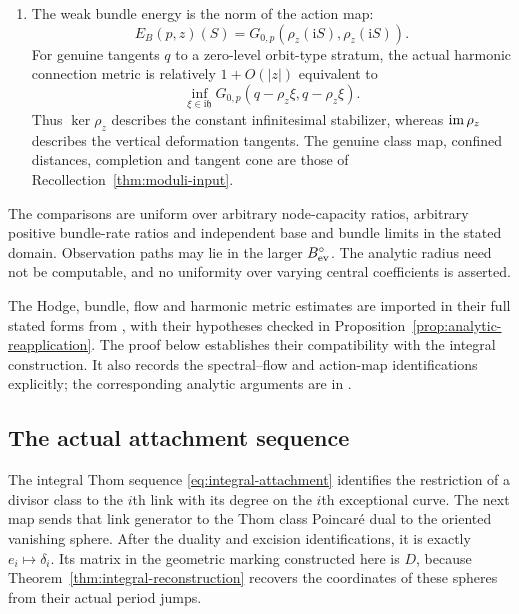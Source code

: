 \begin{theorem}
\begin{enumerate}
\item The weak bundle energy is the norm of the action map:
\begin{equation}\label{eq:action-energy-identity}
 E_B(p,z)(S)=G_{0,p}(\rho_z(\mathrm iS),\rho_z(\mathrm iS)).
\end{equation}
For genuine tangents $q$ to a zero-level orbit-type stratum,
the actual harmonic connection metric is relatively
$1+O(|z|)$ equivalent to
\begin{equation}\label{eq:integrated-quotient}
 \inf_{\xi\in\mathrm i\mathfrak h}
       G_{0,p}(q-\rho_z\xi,q-\rho_z\xi).
\end{equation}
Thus $\ker\rho_z$ describes the constant infinitesimal
stabilizer, whereas $\operatorname{im}\rho_z$ describes the vertical
deformation tangents. The genuine class map, confined
distances, completion and tangent cone are those of
Recollection~\ref{thm:moduli-input}.

\end{enumerate}

The comparisons are uniform over arbitrary node-capacity
ratios, arbitrary positive bundle-rate ratios and independent
base and bundle limits in the stated domain. Observation
paths may lie in the larger $B_{\rm ev}^{\circ}$. The analytic
radius need not be computable, and no uniformity over varying
central coefficients is asserted.
\end{theorem}

The Hodge, bundle, flow and harmonic metric estimates are
imported in their full stated forms from \cite{W_Hodge,W_HYM},
with their hypotheses checked in
Proposition~\ref{prop:analytic-reapplication}. The proof below
establishes their compatibility with the integral construction.
It also records the spectral--flow and action-map
identifications explicitly; the corresponding analytic
arguments are in \cite[Sections~10--12]{W_HYM}.

\subsection{The actual attachment sequence}

The integral Thom sequence \eqref{eq:integral-attachment}
identifies the restriction of a divisor class to the $i$th
link with its degree on the $i$th exceptional curve.
The next map sends that link generator to the Thom class
Poincar\'e dual to the oriented vanishing sphere. After the
duality and excision identifications, it is exactly
$e_i\mapsto\delta_i$. Its matrix in the geometric marking
constructed here is $D$, because
Theorem~\ref{thm:integral-reconstruction} recovers the
coordinates of these spheres from their actual period jumps.

